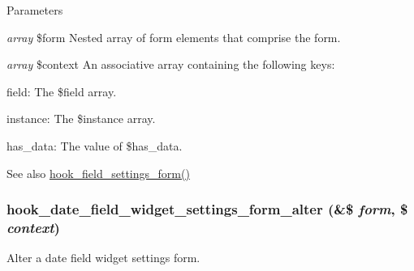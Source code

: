 \begin{DoxyParams}{Parameters}
\item[{\em array}]\$form Nested array of form elements that comprise the form. \item[{\em array}]\$context An associative array containing the following keys:
\begin{DoxyItemize}
\item field: The \$field array.
\item instance: The \$instance array.
\item has\_\-data: The value of \$has\_\-data.
\end{DoxyItemize}\end{DoxyParams}
\begin{DoxySeeAlso}{See also}
\hyperlink{group__field__types_gab8a2ed808857cc6f3cb661fbc99d30d4}{hook\_\-field\_\-settings\_\-form()} 
\end{DoxySeeAlso}
\hypertarget{date_8api_8php_a0c2475c846f8750a83b95ea852bf42cf}{
\subsubsection[{hook\_\-date\_\-field\_\-widget\_\-settings\_\-form\_\-alter}]{\setlength{\rightskip}{0pt plus 5cm}hook\_\-date\_\-field\_\-widget\_\-settings\_\-form\_\-alter (\&\$ {\em form}, \/  \$ {\em context})}}
\label{date_8api_8php_a0c2475c846f8750a83b95ea852bf42cf}
Alter a date field widget settings form.


